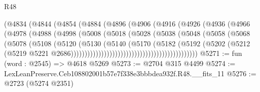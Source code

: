 \begin{lexlean}{R48}
\begin{coremodule}
                                  (@4834
                                    (@4844
                                      (@4854
                                        (@4884
                                          (@4896
                                            (@4906
                                              (@4916
                                                (@4926
                                                  (@4936
                                                    (@4966
                                                      (@4978
                                                        (@4988
                                                          (@4998
                                                            (@5008
                                                              (@5018
                                                                (@5028
                                                                  (@5038
                                                                    (@5048
                                                                      (@5058
                                                                        (@5068
                                                                          (@5078
                                                                            (@5108
                                                                              (@5120
                                                                                (@5130
                                                                                  (@5140
                                                                                    (@5170
                                                                                      (@5182
                                                                                        (@5192
                                                                                          (@5202
                                                                                            (@5212
                                                                                              (@5219
                                                                                                @5221
                                                                                                @2686))))))))))))))))))))))))))))))))))))))))))))))
@5271 := fun (word : @2545) => @4618 @5269
@5273 := @2704 @315 @4499
@5274 := LexLeanPreserve.Ceb108802001b57e7f338e3bbbdea932f.R48.__fits_11
@5276 := @2723 (@5274 @2351)

\end{coremodule}
\end{lexlean}
